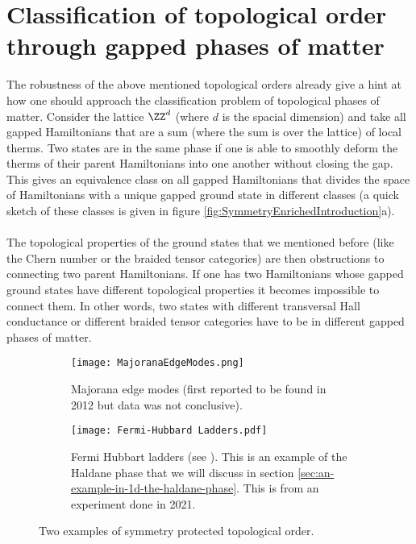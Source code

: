\section{Classification of topological order through gapped phases of matter}
The robustness of the above mentioned topological orders already give a hint at how one should approach the classification problem of topological phases of matter. Consider the lattice $\ZZ^d$ (where $d$ is the spacial dimension) and take all gapped Hamiltonians that are a sum (where the sum is over the lattice) of local therms. Two states are in the same phase if one is able to smoothly deform the therms of their parent Hamiltonians into one another without closing the gap. This gives an equivalence class on all gapped Hamiltonians that divides the space of Hamiltonians with a unique gapped ground state in different classes (a quick sketch of these classes is given in figure \ref{fig:SymmetryEnrichedIntroduction}a).
\\\\
The topological properties of the ground states that we mentioned before (like the Chern number or the braided tensor categories) are then obstructions to connecting two parent Hamiltonians. If one has two Hamiltonians whose gapped ground states have different topological properties it becomes impossible to connect them. In other words, two states with different transversal Hall conductance or different braided tensor categories have to be in different gapped phases of matter.
\begin{figure}
	\begin{subfigure}[b]{0.45\textwidth}
		\centering
		\texttt{[image: MajoranaEdgeModes.png]}
		\caption{Majorana edge modes (first reported to be found in 2012 but data was not conclusive).}
	\end{subfigure}
	\hfil
	\begin{subfigure}[b]{0.45\textwidth}
		\centering
		\texttt{[image: Fermi-Hubbard Ladders.pdf]}
		\caption{Fermi Hubbart ladders (see \cite{sompet2022realizing}). This is an example of the Haldane phase that we will discuss in section \ref{sec:an-example-in-1d-the-haldane-phase}. This is from an experiment done in 2021.}
	\end{subfigure}
	\caption{Two examples of symmetry protected topological order.}
	\label{fig:SymmetryProtectedTopologicalOrderFigures}
\end{figure}
